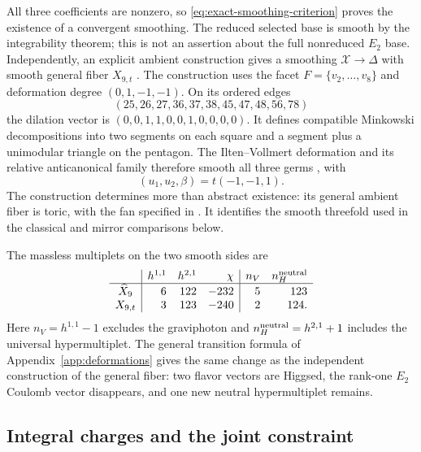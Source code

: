 All three coefficients are nonzero, so
\eqref{eq:exact-smoothing-criterion} proves the existence of a convergent
smoothing. The reduced selected base is smooth by the integrability
theorem; this is not an assertion about the full nonreduced $E_2$ base.
Independently, an explicit ambient construction gives a smoothing
$\mathcal X\to\Delta$ with smooth general fiber $X_{9,t}$
\cite[Theorem~11.8]{Wuebben:2026smoothing}. The construction uses the
facet $F=\{v_2,\ldots,v_8\}$ and deformation degree $(0,1,-1,-1)$.
On its ordered edges
\begin{equation}
 (25,26,27,36,37,38,45,47,48,56,78)
 \label{eq:x9-facet-edges}
\end{equation}
the dilation vector is $(0,0,1,1,0,0,1,0,0,0,0)$. It defines
compatible Minkowski decompositions into two segments on each square
and a segment plus a unimodular triangle on the pentagon. The
Ilten--Vollmert deformation and its relative anticanonical family
therefore smooth all three germs
\cite{Altmann:1995,Ilten:2012,Wuebben:2026smoothing}, with
\begin{equation}
 (u_1,u_2,\beta)=t(-1,-1,1).
 \label{eq:x9-family-direction}
\end{equation}
The construction determines more than abstract existence: its general
ambient fiber is toric, with the fan specified in
\cite[Section~11.3]{Wuebben:2026smoothing}. It identifies the smooth
threefold used in the classical and mirror comparisons below.

The massless multiplets on the two smooth sides are
\begin{equation}
\begin{array}{c|rrr|rr}
 &h^{1,1}&h^{2,1}&\chi&n_V&n_H^{\rm neutral}\\\hline
 \widehat X_9&6&122&-232&5&123\\
 X_{9,t}&3&123&-240&2&124 .
\end{array}
\label{eq:x9-spectrum-table}
\end{equation}
Here $n_V=h^{1,1}-1$ excludes the graviphoton and
$n_H^{\rm neutral}=h^{2,1}+1$ includes the universal hypermultiplet.
The general transition formula of Appendix~\ref{app:deformations}
gives the same change as the independent construction of the general
fiber: two flavor vectors are Higgsed, the rank-one $E_2$ Coulomb
vector disappears, and one new neutral hypermultiplet remains.

\subsection{Integral charges and the joint constraint}

